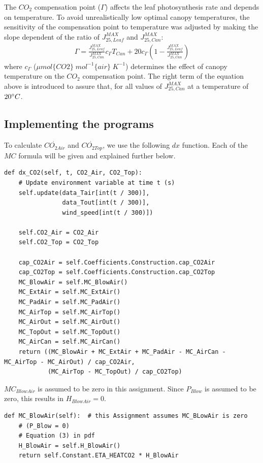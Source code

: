 \documentclass[a4paper]{article}
\begin{document}
The \(CO_2\) compensation point (\(\Gamma\)) affects the leaf photosynthesis rate and depends on temperature. To avoid unrealistically low optimal canopy temperatures, the sensitivity of the compensation point to temperature was adjusted by making the slope dependent of the ratio of \(J^{MAX}_{25,Leaf}\) and \(J^{MAX}_{25,Can}\):
\begin{align}
  \Gamma = \frac{J^{MAX}_{25,Leaf}}{J^{MAX}_{25,Can}}c_{\Gamma} T_{Can} + 20 c_{\Gamma} \left(1-\frac{J^{MAX}_{25,Leaf}}{J^{MAX}_{25,Can}}\right)
\end{align}
where \(c_{\Gamma}\) (\(\mu mol\{CO2\}\;mol^{-1}\{air\}\;K^{-1}\)) determines the effect of canopy temperature on the \(CO_2\) compensation point. The right term of the equation above is introduced to assure that, for all values of \(J^{MAX}_{25,Can}\) at a temperature of \(20 \degree C\).

\newpage
\subsection{Implementing the programs}
To calculate \(\dot{CO_{2 Air}}\) and \(\dot{CO_{2 Top}}\), we use the following \(dx\) function. Each of the \(MC\) formula will be given and explained further below.

\begin{mdframed}[leftline=false,rightline=false,backgroundcolor=magenta!10,nobreak=true]
  \begin{verbatim}
def dx_CO2(self, t, CO2_Air, CO2_Top):
    # Update environment variable at time t (s)
    self.update(data_Tair[int(t / 300)],
                data_Tout[int(t / 300)],
                wind_speed[int(t / 300)])

    self.CO2_Air = CO2_Air
    self.CO2_Top = CO2_Top

    cap_CO2Air = self.Coefficients.Construction.cap_CO2Air
    cap_CO2Top = self.Coefficients.Construction.cap_CO2Top
    MC_BlowAir = self.MC_BlowAir()
    MC_ExtAir = self.MC_ExtAir()
    MC_PadAir = self.MC_PadAir()
    MC_AirTop = self.MC_AirTop()
    MC_AirOut = self.MC_AirOut()
    MC_TopOut = self.MC_TopOut()
    MC_AirCan = self.MC_AirCan()
    return ((MC_BlowAir + MC_ExtAir + MC_PadAir - MC_AirCan - MC_AirTop - MC_AirOut) / cap_CO2Air,
            (MC_AirTop - MC_TopOut) / cap_CO2Top)
  \end{verbatim}
\end{mdframed}

\(MC_{BlowAir}\) is assumed to be zero in this assignment.
Since \(P_{Blow}\) is assumed to be zero, this results in \(H_{BlowAir} = 0\).
\begin{mdframed}[leftline=false,rightline=false,backgroundcolor=magenta!10,nobreak=true]
  \begin{verbatim}
def MC_BlowAir(self):  # this Assignment assumes MC_BLowAir is zero
    # (P_Blow = 0)
    # Equation (3) in pdf
    H_BlowAir = self.H_BlowAir()
    return self.Constant.ETA_HEATCO2 * H_BlowAir
  \end{verbatim}
\end{mdframed}
\end{document}

